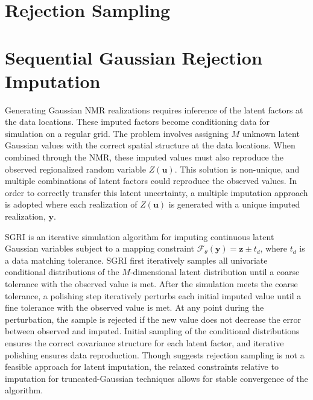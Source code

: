 \FloatBarrier
\section{Rejection Sampling}
\label{sec:reject}


\FloatBarrier
\section{Sequential Gaussian Rejection Imputation}
\label{sec:sgri}

Generating Gaussian \gls{NMR} realizations requires inference of the latent factors at the data locations. These imputed factors become conditioning data for simulation on a regular grid. The problem involves assigning $M$ unknown latent Gaussian values with the correct spatial structure at the data locations. When combined through the \gls{NMR}, these imputed values must also reproduce the observed regionalized random variable $Z(\mathbf{u})$. This solution is non-unique, and multiple combinations of latent factors could reproduce the observed values. In order to correctly transfer this latent uncertainty, a multiple imputation \citep{barnett2015multivariate} approach is adopted where each realization of $Z(\mathbf{u})$ is generated with a unique imputed realization, $\mathbf{y}$.

\Gls{SGRI} is an iterative simulation algorithm for imputing continuous latent Gaussian variables subject to a mapping constraint $\mathcal{F}_{\theta}\left(\mathbf{y}\right)=\mathbf{z} \pm t_{d}$, where $t_{d}$ is a data matching tolerance. \Gls{SGRI} first iteratively samples all univariate conditional distributions of the $M$-dimensional latent distribution until a coarse tolerance with the observed value is met. After the simulation meets the coarse tolerance, a polishing step iteratively perturbs each initial imputed value until a fine tolerance with the observed value is met. At any point during the perturbation, the sample is rejected if the new value does not decrease the error between observed and imputed. Initial sampling of the conditional distributions ensures the correct covariance structure for each latent factor, and iterative polishing ensures data reproduction. Though \cite{armstrong2011plurigaussian} suggests rejection sampling is not a feasible approach for latent imputation, the relaxed constraints relative to imputation for truncated-Gaussian techniques allows for stable convergence of the algorithm.

